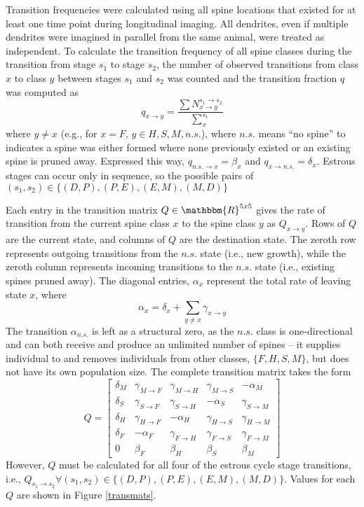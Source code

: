 \documentclass[11pt]{article}
\begin{document}
Transition frequencies were calculated using all spine locations that existed for at least one time point during longitudinal imaging. All dendrites, even if multiple dendrites were imagined in parallel from the same animal, were treated as independent. To calculate the transition frequency of all spine classes during the transition from stage $s_1$ to stage $s_2$, the number of observed transitions from class $x$ to class $y$ between stages $s_1$ and $s_2$ was counted and the transition fraction $q$ was computed as
\[q_{x\to y}=\frac{\sum N^{s_1 \to s_2}_{x\to y}}{\sum^{s_1}_{x}}\]
where $y \neq x$ (e.g., for $x=F$, $y\in{H,S,M,n.s.}$), where $n.s.$ means ``no spine'' to indicates a spine was either formed where none previously existed or an existing spine is pruned away. Expressed this way, $q_{n.s.\to x}=\beta_x$ and $q_{x \to n.s.}=\delta_x$. Estrous stages can occur only in sequence, so the possible pairs of $(s_1,s_2)\in \{(D,P), (P,E), (E,M), (M,D)\}$

Each entry in the transition matrix $Q\in \mathbbm{R}^{5x5}$ gives the rate of transition from the current spine class $x$ to the spine class $y$ as $Q_{x\to y}$. Rows of $Q$ are the current state, and columns of $Q$ are the destination state. The zeroth row represents outgoing transitions from the $n.s.$ state (i.e., new growth), while the zeroth column represents incoming transitions to the $n.s.$ state (i.e., existing spines pruned away). The diagonal entries, $\alpha_x$ represent the total rate of leaving state $x$, where
\[\alpha_x=\delta_x+\sum_{y\neq x}\gamma_{x\to y}\]
The transition $\alpha_{n.s.}$ is left as a structural zero, as the $n.s.$ class is one-directional and can both receive and produce an unlimited number of spines -- it supplies individual to and removes individuals from other classes, $\{F,H,S,M\}$, but does not have its own population size. The complete transition matrix takes the form
\[Q = \begin{bmatrix}
\delta_M & \gamma_{M \to F} & \gamma_{M \to H} & \gamma_{M \to S} & -\alpha_M \\
\delta_S & \gamma_{S \to F} & \gamma_{S \to H} & -\alpha_S & \gamma_{S \to M} \\
\delta_H & \gamma_{H \to F} & -\alpha_H & \gamma_{H \to S} & \gamma_{H \to M} \\
\delta_F & -\alpha_F & \gamma_{F \to H} & \gamma_{F \to S} & \gamma_{F \to M} \\
0 & \beta_F & \beta_H & \beta_S & \beta_M
\end{bmatrix}\]
However, $Q$ must be calculated for all four of the estrous cycle stage transitions, i.e., $Q_{s_1\to s_2} \forall (s_1,s_2)\in \{(D,P), (P,E), (E,M), (M,D)\}$. Values for each $Q$ are shown in Figure \ref{transmats}.
\end{document}
